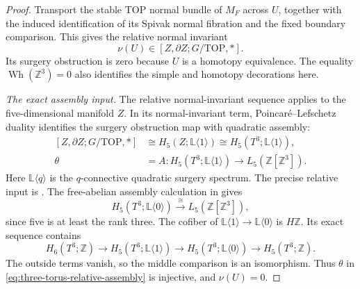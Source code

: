 \begin{proof}
Transport the stable TOP normal bundle of $M_F$ across
$U$, together with the induced identification of its
Spivak normal fibration and the fixed boundary comparison.
This gives the relative normal invariant
\[
 \nu(U)\in[Z,\partial Z;G/\mathrm{TOP},*].
\]
Its surgery obstruction is zero because $U$ is a
homotopy equivalence.  The equality
$\operatorname{Wh}(\mathbb Z^3)=0$
\cite[Example~24.16, p.~278]{Ranicki1992TopologicalManifolds}
also identifies the simple and homotopy decorations here.

\emph{The exact assembly input.}
The relative normal-invariant sequence applies to the
five-dimensional manifold $Z$.  In its normal-invariant
term, Poincar\'e--Lefschetz duality identifies the surgery
obstruction map with quadratic assembly:
\begin{equation}\label{eq:three-torus-relative-assembly}
 \begin{split}
 [Z,\partial Z;G/\mathrm{TOP},*]
   &\cong H_5(Z;\mathbb L\langle1\rangle)
    \cong H_5(T^3;\mathbb L\langle1\rangle),\\
 \theta&=A:
 H_5(T^3;\mathbb L\langle1\rangle)
       \longrightarrow L_5(\mathbb Z[\mathbb Z^3]).
 \end{split}
\end{equation}
Here $\mathbb L\langle q\rangle$ is the $q$-connective
quadratic surgery spectrum.  The precise relative input
is \cite[Definition~18.2, pp.~197--198; the relative-version
paragraph on p.~198; Proposition~18.3 and Theorem~18.5,
pp.~198--201]{Ranicki1992TopologicalManifolds}.
The free-abelian assembly calculation in
\cite[Example~24.16, p.~278]{Ranicki1992TopologicalManifolds}
gives
\[
 H_5(T^3;\mathbb L\langle0\rangle)
                \xrightarrow{\ \cong\ }
 L_5(\mathbb Z[\mathbb Z^3]),
\]
since five is at least the rank three.
The cofiber of
$\mathbb L\langle1\rangle\to\mathbb L\langle0\rangle$
is $H\mathbb Z$.  Its exact sequence contains
\[
 H_6(T^3;\mathbb Z)\longrightarrow
 H_5(T^3;\mathbb L\langle1\rangle)\longrightarrow
 H_5(T^3;\mathbb L\langle0\rangle)\longrightarrow
 H_5(T^3;\mathbb Z).
\]
The outside terms vanish, so the middle comparison is
an isomorphism.  Thus $\theta$ in
\eqref{eq:three-torus-relative-assembly} is injective,
and $\nu(U)=0$.


\end{proof}
